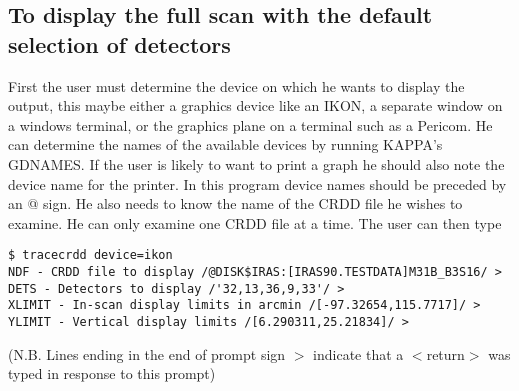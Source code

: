 \subsection{To display the full scan with the default selection of detectors}
First the user must determine the device on which he wants to display the
output, this maybe either a graphics device like an IKON, a separate window on
a windows terminal, or the graphics plane on a terminal such as a Pericom. He
can determine the names of the available devices by running KAPPA's GDNAMES. If
the user is likely to want to print a graph he should also note the device name
for the printer. In this program device names should be preceded by an @ sign.
He also needs to know the name of the CRDD file he wishes to examine. He can
only examine one CRDD file at a time. The user can then type
\begin{small}
\begin{verbatim}
$ tracecrdd device=ikon
NDF - CRDD file to display /@DISK$IRAS:[IRAS90.TESTDATA]M31B_B3S16/ > 
DETS - Detectors to display /'32,13,36,9,33'/ > 
XLIMIT - In-scan display limits in arcmin /[-97.32654,115.7717]/ > 
YLIMIT - Vertical display limits /[6.290311,25.21834]/ > 
\end{verbatim}
\end{small}

(N.B. Lines ending in the end of prompt sign $>$ indicate that  a $<$return$>$
was typed in response to this prompt)

